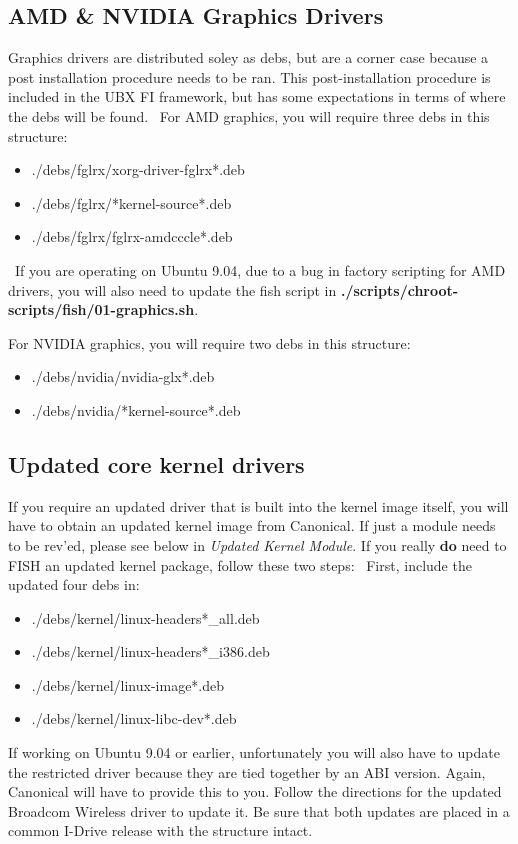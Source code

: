\documentclass[letterpaper,10pt,titlepage]{article}
\begin{document}
\subsection{ AMD \& NVIDIA Graphics Drivers}
Graphics drivers are distributed soley as debs, but are a corner case because a post installation procedure needs to be ran.  This post-installation procedure is included in the UBX FI framework, but has some expectations in terms of where the debs will be found.
\
For AMD graphics, you will require three debs in this structure:
\begin{itemize}
\item ./debs/fglrx/xorg-driver-fglrx*.deb
\item ./debs/fglrx/*kernel-source*.deb
\item ./debs/fglrx/fglrx-amdcccle*.deb
\end{itemize}
\
If you are operating on Ubuntu 9.04, due to a bug in factory scripting for AMD drivers, you will also need to update the fish script in \textbf{./scripts/chroot-scripts/fish/01-graphics.sh}.

For NVIDIA graphics, you will require two debs in this structure:
\begin{itemize}
\item ./debs/nvidia/nvidia-glx*.deb
\item ./debs/nvidia/*kernel-source*.deb
\end{itemize}


\subsection{Updated core kernel drivers}
If you require an updated driver that is built into the kernel image itself, you will have to obtain an updated kernel image from Canonical.  If just a module needs to be rev'ed, please see below in \textit{Updated Kernel Module}.  If you really \textbf{do} need to FISH an updated kernel package, follow these two steps:
\
First, include the updated four debs in:
\begin{itemize}
\item ./debs/kernel/linux-headers*_all.deb
\item ./debs/kernel/linux-headers*_i386.deb
\item ./debs/kernel/linux-image*.deb
\item ./debs/kernel/linux-libc-dev*.deb
\end{itemize}
If working on Ubuntu 9.04 or earlier, unfortunately you will also have to update the restricted driver because they are tied together by an ABI version.  Again, Canonical will have to provide this to you.  Follow the directions for the updated Broadcom Wireless driver to update it.  Be sure that both updates are placed in a common I-Drive release with the structure intact.
\end{document}
